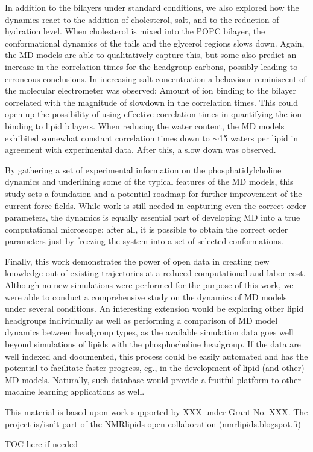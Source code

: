 \documentclass[journal=jpcbfk,manuscript=article,layout=twocolumn]{achemso}
\begin{document}
In addition to the bilayers under standard conditions, we also explored how the dynamics react to the addition of cholesterol, salt, and to the reduction of hydration level. When cholesterol is mixed into the POPC bilayer, the conformational dynamics of the tails and the glycerol regions slows down. Again, the MD models are able to qualitatively capture this, but some also predict an increase in the correlation times for the headgroup carbons, possibly leading to erroneous conclusions. In increasing salt concentration a behaviour reminiscent of the molecular electrometer was observed: Amount of ion binding to the bilayer correlated with the magnitude of slowdown in the correlation times. This could open up the possibility of using effective correlation times in quantifying the ion binding to lipid bilayers. When reducing the water content, the MD models exhibited somewhat constant correlation times down to $\sim$15 waters per lipid in agreement with experimental data. After this, a slow down was observed.

By gathering a set of experimental information on the phosphatidylcholine dynamics and underlining some of the typical features of the MD models, this study sets a foundation and a potential roadmap for further improvement of the current force fields. While work is still needed in capturing even the correct order parameters, the dynamics is equally essential part of developing MD into a true computational microscope; after all, it is possible to obtain the correct order parameters just by freezing the system into a set of selected conformations.  

Finally, this work demonstrates the power of open data in creating new knowledge out of existing trajectories at a reduced computational and labor cost. Although no new simulations were performed for the purpose of this work, we were able to conduct a comprehensive study on the dynamics of MD models under several conditions. An interesting extension would be exploring other lipid headgroups individually as well as performing a comparison of MD model dynamics between headgroup types, as the available simulation data goes well beyond simulations of lipids with the phosphocholine headgroup. If the data are well indexed and documented, this process could be easily automated and has the potential to facilitate faster progress, eg., in the development of lipid (and other) MD models. Naturally, such database would provide a fruitful platform to other machine learning applications as well. 


\acknowledgement
  This material is based upon work supported by XXX under Grant No. XXX. The project is/isn't part of the NMRlipids open collaboration (nmrlipids.blogspot.fi)



\begin{tocentry}
 TOC here if needed
\end{tocentry}
\end{document}
